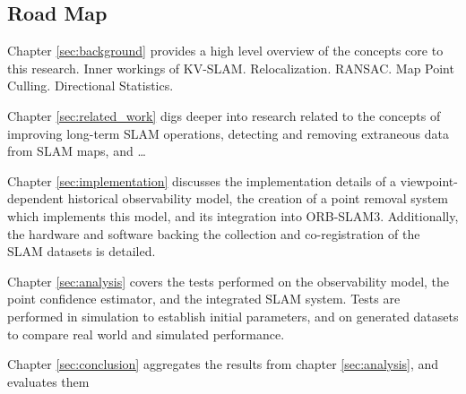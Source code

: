 \subsection{Road Map}

Chapter \ref{sec:background} provides a high level overview of the concepts core to this research. Inner workings of KV-SLAM. Relocalization. RANSAC. Map Point Culling. Directional Statistics.

Chapter \ref{sec:related_work} digs deeper into research related to the concepts of improving long-term SLAM operations, detecting and removing extraneous data from SLAM maps, and \dots

Chapter \ref{sec:implementation} discusses the implementation details of a viewpoint-dependent historical observability model, the creation of a point removal system which implements this model, and its integration into ORB-SLAM3. Additionally, the hardware and software backing the collection and co-registration of the SLAM datasets is detailed.

Chapter \ref{sec:analysis} covers the tests performed on the observability model, the point confidence estimator, and the integrated SLAM system. Tests are performed in simulation to establish initial parameters, and on generated datasets to compare real world and simulated performance.

Chapter \ref{sec:conclusion} aggregates the results from chapter \ref{sec:analysis}, and evaluates them 